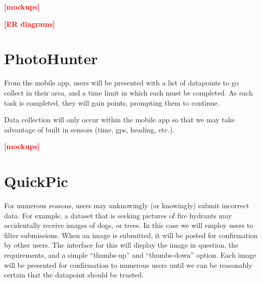 \documentclass[aspectratio=169]{beamer}
\newcommand{\todo}[1]{\textcolor{red}{\textbf{[#1]}}}
\begin{document}
\begin{frame}
  \todo{mockups}
\end{frame}

\begin{frame}
  \todo{ER diagrams}
\end{frame}

\section{PhotoHunter}

\begin{frame}
  From the mobile app, users will be presented with a list of
  datapoints
  to go collect in their area, and a time limit in which each must be
  completed. As each task is completed, they will gain points,
  prompting
  them to continue.

  Data collection will only occur within the mobile app so that we may
  take advantage of built in sensors (time, gps, heading, etc.).
\end{frame}

\begin{frame}
  \todo{mockups}
\end{frame}

\section{QuickPic}

\begin{frame}
  For numerous reasons, users may unknowingly (or knowingly) submit
  incorrect data. For example, a dataset that is seeking pictures of
  fire hydrants may accidentally receive images of dogs, or trees. In
  this case we will employ users to filter submissions. When an image
  is
  submitted, it will be posted for confirmation by other users. The
  interface for this will display the image in question, the
  requirements, and a simple ``thumbs-up'' and ``thumbs-down'' option.
  Each image will be presented for confirmation to numerous users
  until
  we can be reasonably certain that the datapoint should be trusted.
\end{frame}
\end{document}

